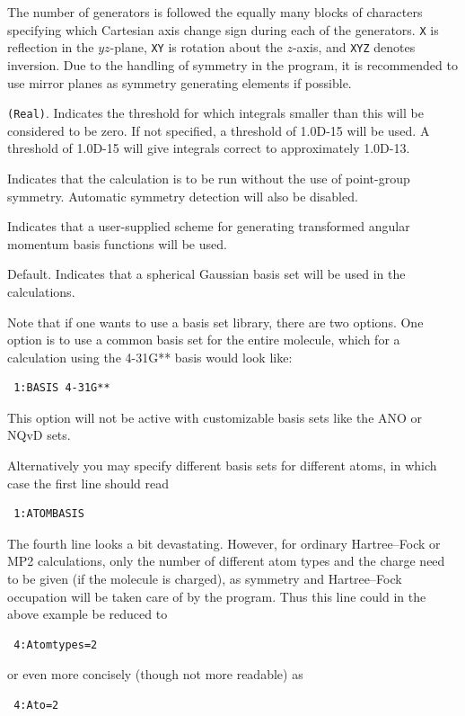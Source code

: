 \begin{description}
\begin{description}
The number of generators is followed the
equally many blocks of characters specifying which Cartesian axis
change sign during each of the generators. {\tt X}
is reflection
in the \mbox{$yz$-plane}, {\tt XY} is rotation about
the \mbox{$z$-axis},
and {\tt XYZ} denotes inversion. Due to the handling
of symmetry in
the program, it is recommended to use mirror planes as symmetry
generating elements if possible.
\item[Integrals] \verb|(Real)|. Indicates the threshold for which
  integrals smaller than this will be considered to be zero. If not
  specified, a threshold of 1.0D-15 will be used. A threshold
of 1.0D-15 will give integrals correct to approximately 1.0D-13.
\item[Nosymmetry] Indicates that the calculation is to be run without
  the use of point-group symmetry. Automatic symmetry detection will
  also be disabled.
\item[Own] Indicates that a user-supplied scheme for generating
  transformed angular momentum basis functions will be used.
\item[Spherical] Default. Indicates that a spherical Gaussian basis
  set will be used in the calculations.
\end{description}
\end{description}

Note that if one wants to use a basis set
library, there are two
options. One option is to use a common basis set for the entire molecule,
which for a calculation using the 4-31G** basis would look like:
\begin{verbatim}
 1:BASIS 4-31G**
\end{verbatim}
This option will not be active with customizable basis sets like the
ANO or NQvD sets.


Alternatively you may specify different basis sets for different
atoms, in which case the first line should read
\begin{verbatim}
 1:ATOMBASIS
\end{verbatim}

The fourth line looks a bit devastating. However, for ordinary
Hartree--Fock
or MP2 calculations, only the number of different atom types and the charge
need to be given (if the molecule is charged), as symmetry and
Hartree--Fock occupation
will be taken care of by the program. Thus
this line could in the above example be reduced to
\begin{verbatim}
 4:Atomtypes=2
\end{verbatim}
or even more concisely (though not more readable) as
\begin{verbatim}
 4:Ato=2
\end{verbatim}


